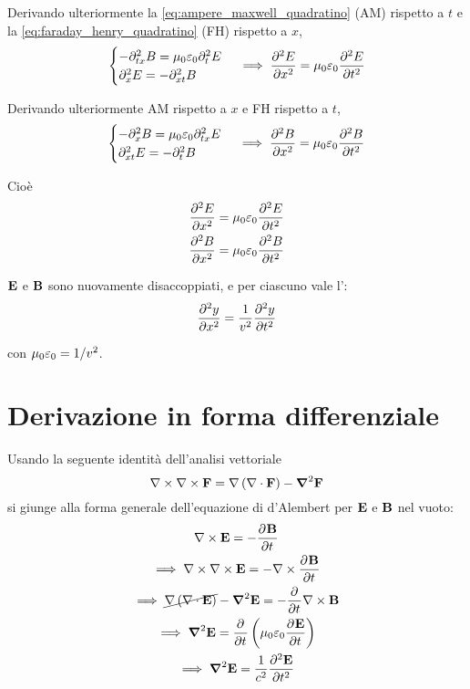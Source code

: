 Derivando ulteriormente la \eqref{eq:ampere_maxwell_quadratino} (AM) rispetto a $t$ e la \eqref{eq:faraday_henry_quadratino} (FH) rispetto a $x$,
\begin{equation}
    \begin{cases}
        - \partial^2_{tx} B = \mu_0 \eps_0 \parder[E][2]{t} \\
        \parder[E][2]{x} = - \partial^2_{xt} B
    \end{cases}
    \implies \parder[E][2]{x} = \mu_0 \eps_0 \parder[E][2]{t}
\end{equation}

Derivando ulteriormente AM rispetto a $x$ e FH rispetto a $t$,
\begin{equation}
    \begin{cases}
        - \parder[B][2]{x} = \mu_0 \eps_0 \partial^2_{tx} E \\
        \partial^2_{xt} E = - \parder[B][2]{t}
    \end{cases}
    \implies \parder[B][2]{x} = \mu_0 \eps_0 \parder[B][2]{t}
\end{equation}

Cioè
\begin{gather}
    \parder[E][2]{x} = \mu_0 \eps_0 \parder[E][2]{t} \\
    \parder[B][2]{x} = \mu_0 \eps_0 \parder[B][2]{t}
\end{gather}

$\mathbf{E}$ e $\mathbf{B}$ sono nuovamente disaccoppiati, e per ciascuno vale l':
\begin{equation}
\label{eq:dalembert_1d}
    \parder[y][2]{x} = \frac{1}{v^2} \parder[y][2]{t}
\end{equation}

con $\mu_0 \varepsilon_0 = 1/v^2$.

\section{Derivazione in forma differenziale}

Usando la seguente identità dell'analisi vettoriale
\begin{equation}
    \nabla \times \nabla \times \mathbf{F} = \nabla \left( \nabla \cdot \mathbf{F} \right) - \boldsymbol{\nabla}^2 \mathbf{F}
\end{equation}
si giunge alla forma generale dell'equazione di d'Alembert per $\mathbf{E}$ e $\mathbf{B}$ nel vuoto:
\begin{gather}
    \curl \E = - \parder[\B]{t} \\
    \implies
    \curl \curl \E = - \curl \parder[\B]{t} \\
    \implies
    \cancel{\grad \pts{\diver \E}} - \vlapl \E = - \parder{t} \curl \B \\
    \implies
    \vlapl \E = \parder{t} \pts{\mu_0 \eps_0 \parder[\E]{t}} \\
    \implies
    \vlapl \E = \frac{1}{c^2} \parder[\E][2]{t}
\end{gather}

